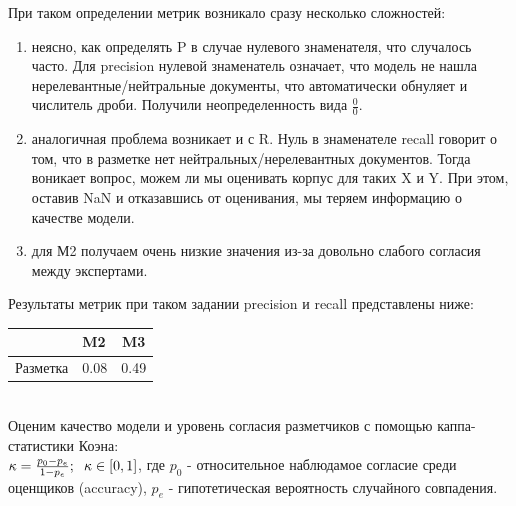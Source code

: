 \documentclass{article}
\begin{document}
При таком определении метрик возникало сразу несколько сложностей:
\begin{enumerate}
    \item неясно, как определять P в случае нулевого знаменателя, что случалось часто. Для precision нулевой знаменатель означает, что модель не нашла нерелевантные/нейтральные документы, что автоматически обнуляет и числитель дроби. Получили неопределенность вида $\frac{0}{0}$.
    \item аналогичная проблема возникает и с R. Нуль в знаменателе recall говорит о том, что в разметке нет нейтральных/нерелевантных документов. Тогда воникает вопрос, можем ли мы оценивать корпус для таких X и Y. При этом, оставив NaN и отказавшись от оценивания, мы теряем информацию о качестве модели.
    \item для М2 получаем очень низкие значения из-за довольно слабого согласия между экспертами.
\end{enumerate}
Результаты метрик при таком задании precision и recall представлены ниже:
\begin{table}[!htb]
\center
\begin{tabular}{|l|l|l|}
\hline
         & M2   & \multicolumn{1}{c|}{M3} \\ \hline
Разметка & 0.08 & 0.49                    \\ \hline
\end{tabular}
\end{table}\\

Оценим качество модели и уровень согласия разметчиков с помощью каппа-статистики Коэна: \\
$\kappa = \frac{p_0 - p_e}{1 - p_e}; \hspace{0.2cm} \kappa \in [0, 1]$, где $p_0$ - относительное наблюдамое согласие среди оценщиков (accuracy), $p_e$ - гипотетическая вероятность случайного совпадения.\\
\end{document}

